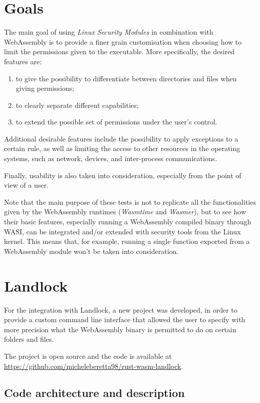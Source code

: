 \section{Goals}

The main goal of using \textit{Linux Security Modules} in combination with WebAssembly
is to provide a finer grain customisation when choosing how to limit the permissions given
to the executable. More specifically, the desired features are:
\begin{enumerate}
  \item to give the possibility to differentiate between directories and files when giving permissions;
  \item to clearly separate different capabilities;
  \item to extend the possible set of permissions under the user's control.
\end{enumerate}

Additional desirable features include the possibility to apply exceptions to a certain rule, as well
as limiting the access to other resources in the operating systems, such as network, devices, and
inter-process communications.

Finally, usability is also taken into consideration, especially from the point of view of a user.

Note that the main purpose of these tests is not to replicate all the functionalities given by
the WebAssembly runtimes (\textit{Wasmtime} and \textit{Wasmer}), but to see how their basic features,
especially running a WebAssembly compiled binary through WASI, can be integrated and/or extended with
security tools from the Linux kernel.
This means that, for example, running a single function exported from a WebAssembly module won't be taken
into consideration.

\newpage
\section{Landlock}

For the integration with Landlock, a new project was developed, in order to provide
a custom command line interface that allowed the user to specify with more precision what
the WebAssembly binary is permitted to do on certain folders and files.

The project is open source and the code is available at \url{https://github.com/micheleberetta98/rust-wasm-landlock}.

\subsection{Code architecture and description}\label{sec:landlock-code-architecture}

